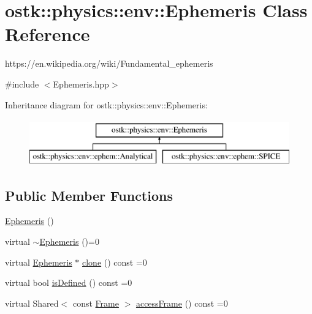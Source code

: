 \hypertarget{classostk_1_1physics_1_1env_1_1_ephemeris}{}\section{ostk\+:\+:physics\+:\+:env\+:\+:Ephemeris Class Reference}
\label{classostk_1_1physics_1_1env_1_1_ephemeris}


https\+://en.wikipedia.\+org/wiki/\+Fundamental\+\_\+ephemeris  




{\ttfamily \#include $<$Ephemeris.\+hpp$>$}

Inheritance diagram for ostk\+:\+:physics\+:\+:env\+:\+:Ephemeris\+:\begin{figure}[H]
\begin{center}
\leavevmode
\includegraphics[height=2.000000cm]{classostk_1_1physics_1_1env_1_1_ephemeris}
\end{center}
\end{figure}
\subsection*{Public Member Functions}
\begin{DoxyCompactItemize}
\item 
\hyperlink{classostk_1_1physics_1_1env_1_1_ephemeris_a4624f9a04ae931f4b4d40ceb2c37711c}{Ephemeris} ()
\item 
virtual \hyperlink{classostk_1_1physics_1_1env_1_1_ephemeris_a13b371b20fc11505ddd9aa05db764c58}{$\sim$\+Ephemeris} ()=0
\item 
virtual \hyperlink{classostk_1_1physics_1_1env_1_1_ephemeris}{Ephemeris} $\ast$ \hyperlink{classostk_1_1physics_1_1env_1_1_ephemeris_a3a35daaff1359882ae16b69ab6e399f6}{clone} () const =0
\item 
virtual bool \hyperlink{classostk_1_1physics_1_1env_1_1_ephemeris_ace5a637a5f25f700dfe1a2cef2b08162}{is\+Defined} () const =0
\item 
virtual Shared$<$ const \hyperlink{classostk_1_1physics_1_1coord_1_1_frame}{Frame} $>$ \hyperlink{classostk_1_1physics_1_1env_1_1_ephemeris_a7a2e78c90901d813311d51d66fcf12bf}{access\+Frame} () const =0
\end{DoxyCompactItemize}


